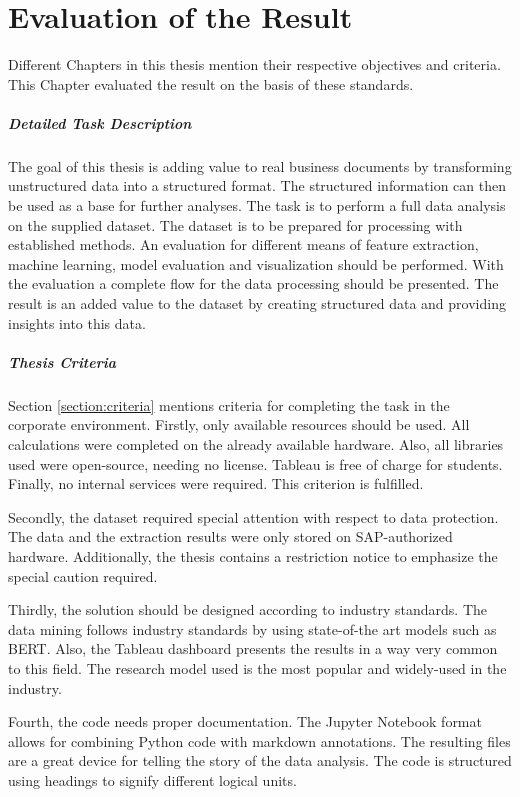 \chapter{Evaluation of the Result}
Different Chapters in this thesis mention their respective objectives and criteria. This Chapter evaluated the result on the basis of these standards.

\paragraph{Detailed Task Description}
The goal of this thesis is adding value to real business documents by transforming unstructured data into a structured format. The structured information can then be used as a base for further analyses.
The task is to perform a full data analysis on the supplied dataset. The dataset is to be prepared for processing with established methods. An evaluation for different means of feature extraction, machine learning, model evaluation and visualization should be performed. With the evaluation a complete flow for the data processing should be presented. The result is an added value to the dataset by creating structured data and providing insights into this data.


\paragraph{Thesis Criteria}
Section \ref{section:criteria} mentions criteria for completing the task in the corporate environment. Firstly, only available resources should be used. All calculations were completed on the already available hardware. Also, all libraries used were open-source, needing no license. Tableau is free of charge for students. Finally, no internal services were required. This criterion is fulfilled.

Secondly, the dataset required special attention with respect to data protection. The data and the extraction results were only stored on SAP-authorized hardware. Additionally, the thesis contains a restriction notice to emphasize the special caution required.

Thirdly, the solution should be designed according to industry standards. The data mining follows industry standards by using state-of-the art models such as \ac{BERT}. Also, the Tableau dashboard presents the results in a way very common to this field. The research model used is the most popular and widely-used in the industry.

Fourth, the code needs proper documentation. The Jupyter Notebook format allows for combining Python code with markdown annotations. The resulting files are a great device for telling the story of the data analysis. The code is structured using headings to signify different logical units.

